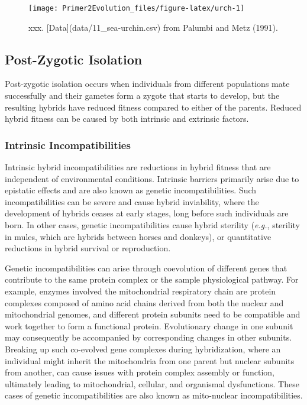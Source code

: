 \documentclass[
]{book}
\begin{document}
\begin{figure}
\texttt{[image: Primer2Evolution\_files/figure-latex/urch-1]} \caption{xxx. [Data](data/11_sea-urchin.csv) from Palumbi and Metz (1991).}\label{fig:urch}
\end{figure}

\hypertarget{post-zygotic-isolation}{%
\subsection{Post-Zygotic Isolation}\label{post-zygotic-isolation}}

Post-zygotic isolation occurs when individuals from different populations mate successfully and their gametes form a zygote that starts to develop, but the resulting hybrids have reduced fitness compared to either of the parents. Reduced hybrid fitness can be caused by both intrinsic and extrinsic factors.

\hypertarget{intrinsic-incompatibilities}{%
\subsubsection*{Intrinsic Incompatibilities}\label{intrinsic-incompatibilities}}

Intrinsic hybrid incompatibilities are reductions in hybrid fitness that are independent of environmental conditions. Intrinsic barriers primarily arise due to epistatic effects and are also known as genetic incompatibilities. Such incompatibilities can be severe and cause hybrid inviability, where the development of hybrids ceases at early stages, long before such individuals are born. In other cases, genetic incompatibilities cause hybrid sterility (\emph{e.g.}, sterility in mules, which are hybrids between horses and donkeys), or quantitative reductions in hybrid survival or reproduction.

Genetic incompatibilities can arise through coevolution of different genes that contribute to the same protein complex or the sample physiological pathway. For example, enzymes involved the mitochondrial respiratory chain are protein complexes composed of amino acid chains derived from both the nuclear and mitochondrial genomes, and different protein subunits need to be compatible and work together to form a functional protein. Evolutionary change in one subunit may consequently be accompanied by corresponding changes in other subunits. Breaking up such co-evolved gene complexes during hybridization, where an individual might inherit the mitochondria from one parent but nuclear subunits from another, can cause issues with protein complex assembly or function, ultimately leading to mitochondrial, cellular, and organismal dysfunctions. These cases of genetic incompatibilities are also known as mito-nuclear incompatibilities.
\end{document}
